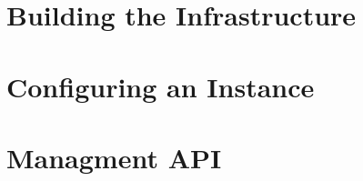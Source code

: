 \documentclass[draft=false,
10pt, %
a4paper, %
oneside, %
headinclude,footinclude, %
]{scrartcl}
\begin{document}

\section{Building the Infrastructure}



\section{Configuring an Instance}\label{section:instance}




\section{Managment API}



\renewcommand{\refname}{\spacedlowsmallcaps{References}} %




\end{document}
